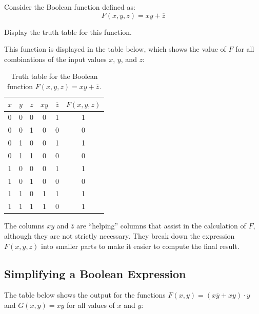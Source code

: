 \begin{example}Consider the Boolean function defined as:
    \[
F(x, y, z) = xy + \overline{z}
\]

Display the truth table for this function.

\begin{solution} This function is displayed in the table below, which shows the value of \( F \) for all combinations of the input values \( x \), \( y \), and \( z \):

\begin{table}[h!]
\begin{center}
\renewcommand{\arraystretch}{1.5} %
\begin{tabular}{c|c|c|c|c|c}

$x$ & $y$ & $z$ & $xy$ & $\overline{z}$ & $F(x, y, z)$ \\
\hline
0 & 0 & 0 & 0 & 1 & 1 \\
\rowcolor{gray!20}
0 & 0 & 1 & 0 & 0 & 0 \\
0 & 1 & 0 & 0 & 1 & 1 \\
\rowcolor{gray!20}
0 & 1 & 1 & 0 & 0 & 0 \\
1 & 0 & 0 & 0 & 1 & 1 \\
\rowcolor{gray!20}
1 & 0 & 1 & 0 & 0 & 0 \\
1 & 1 & 0 & 1 & 1 & 1 \\
\rowcolor{gray!20}
1 & 1 & 1 & 1 & 0 & 1 \\
\end{tabular}
\end{center}
\caption{Truth table for the Boolean function \( F(x, y, z) = xy + \overline{z} \).}
\label{tab:boolean_example}
\end{table}

The columns \( xy \) and \( \overline{z} \) are “helping” columns that assist in the calculation of \( F \), although they are not strictly necessary. They break down the expression \( F(x, y, z) \) into smaller parts to make it easier to compute the final result.
    
\end{solution}
\end{example}

\subsection*{Simplifying a Boolean Expression}

The table below shows the output for the functions \( F(x, y) = (x\overline{y} + xy) \cdot y \) and \( G(x, y) = xy \) for all values of \( x \) and \( y \):

